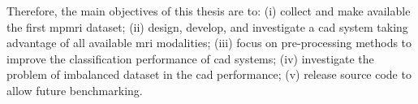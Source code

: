 
Therefore, the main objectives of this thesis are to: (i) collect and make available the first \ac{mpmri} dataset; (ii) design, develop, and investigate a \ac{cad} system taking advantage of all available \ac{mri} modalities; (iii) focus on pre-processing methods to improve the classification performance of \ac{cad} systems; (iv) investigate the problem of imbalanced dataset in the \ac{cad} performance; (v) release source code to allow future benchmarking.
